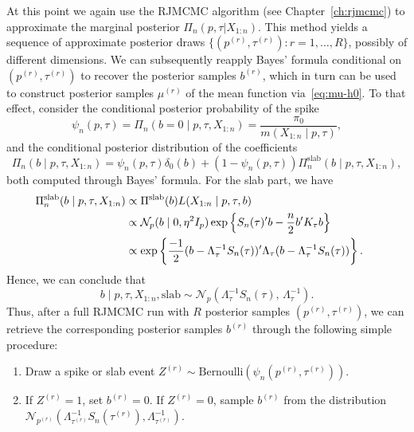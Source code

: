 At this point we again use the \acs{RJMCMC} algorithm (see Chapter~\ref{ch:rjmcmc}) to approximate the marginal posterior \(\Pi_n(p, \tau| X_{1:n})\). This method yields a sequence of approximate posterior draws \(\{(p^{(r)}, \tau^{(r)}): r=1,\dots,R\}\), possibly of different dimensions. We can subsequently reapply Bayes' formula conditional on \((p^{(r)},\tau^{(r)})\) to recover the posterior samples \(b^{(r)}\), which in turn can be used to construct posterior samples \(\mu^{(r)}\) of the mean function via~\eqref{eq:mu-h0}. To that effect, consider the conditional posterior probability of the spike 
\begin{equation}\label{eq:psi-posterior-spike}
\psi_n(p,\tau) = \Pi_n(b=0\mid p,\tau, X_{1:n}) = \frac{\pi_0}{m(X_{1:n}\mid p,\tau)},
\end{equation}
and the conditional posterior distribution of the coefficients
\[
\Pi_n(b\mid p,\tau, X_{1:n}) = \psi_n(p, \tau)\delta_0(b) + (1-\psi_n(p, \tau))\Pi_n^{\text{slab}}(b\mid p,\tau, X_{1:n}),
\]
both computed through Bayes' formula. For the slab part, we have 
\begin{align*}
  \hspace*{-1.4em}\Pi_n^{\text{slab}}(b\mid p,\tau, X_{1:n}) &\propto \Pi^{\text{slab}}(b)L(X_{1:n}\mid p, \tau, b)\\
  &\propto \mathcal N_p(b\mid 0, \eta^2 I_p) \exp\left\{S_n(\tau)'b - \frac{n}{2}b' K_{\tau} b\right\}\\
  &\propto \exp\left\{\frac{-1}{2}(b - \Lambda_\tau^{-1}S_n(\tau))'\Lambda_\tau(b -  \Lambda_\tau^{-1}S_n(\tau)) \right\}.
\end{align*}
Hence, we can conclude that
\begin{equation}\label{eq:mean-b-slab}
  b \mid p,\tau, X_{1:n}, \text{slab} \sim \mathcal N_p\left(\Lambda_\tau^{-1}S_n(\tau),\, \Lambda_\tau^{-1}\right).
\end{equation} 
Thus, after a full \acs{RJMCMC} run with \(R\) posterior samples \((p^{(r)}, \tau^{(r)})\), we can retrieve the corresponding posterior samples \(b^{(r)}\) through the following simple procedure:
\begin{enumerate}
  \item Draw a spike or slab event \(Z^{(r)} \sim \text{Bernoulli}(\psi_n(p^{(r)}, \tau^{(r)}))\).
  \item If \(Z^{(r)}=1\), set \(b^{(r)}=0\). If \(Z^{(r)}=0\), sample \(b^{(r)}\) from the distribution \(\mathcal N_{p^{(r)}}(\Lambda_{\tau^{(r)}}^{-1}S_n(\tau^{(r)}), \Lambda_{\tau^{(r)}}^{-1})\).
\end{enumerate}

